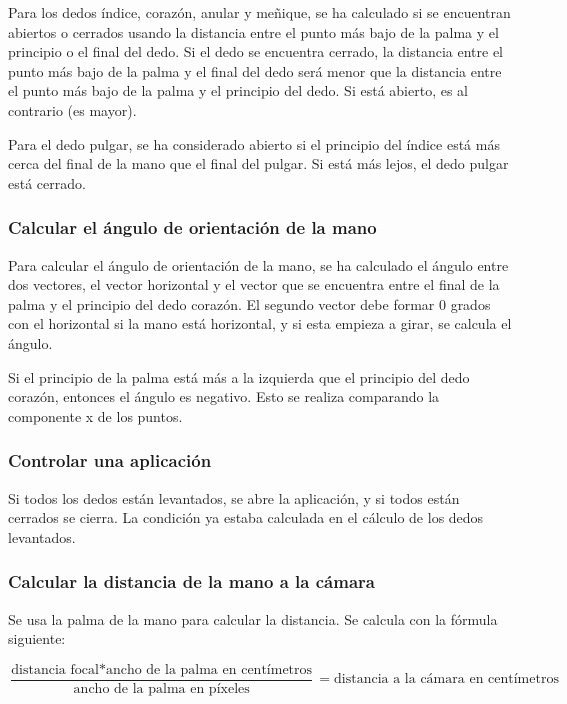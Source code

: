 \documentclass[12pt]{article}
\begin{document}
Para los dedos índice, corazón, anular y meñique, se ha calculado si se encuentran abiertos o cerrados usando la distancia entre el punto más bajo de la palma y el principio o el final del dedo. Si el dedo se encuentra cerrado, la distancia entre el punto más bajo de la palma y el final del dedo será menor que la distancia entre el punto más bajo de la palma y el principio del dedo. Si está abierto, es al contrario (es mayor).

Para el dedo pulgar, se ha considerado abierto si el principio del índice está más cerca del final de la mano que el final del pulgar. Si está más lejos, el dedo pulgar está cerrado.

\subsubsection*{Calcular el ángulo de orientación de la mano}

Para calcular el ángulo de orientación de la mano, se ha calculado el ángulo entre dos vectores, el vector horizontal y el vector que se encuentra entre el final de la palma y el principio del dedo corazón. El segundo vector debe formar 0 grados con el horizontal si la mano está horizontal, y si esta empieza a girar, se calcula el ángulo.

Si el principio de la palma está más a la izquierda que el principio del dedo corazón, entonces el ángulo es negativo. Esto se realiza comparando la componente x de los puntos.

\subsubsection*{Controlar una aplicación}

Si todos los dedos están levantados, se abre la aplicación, y si todos están cerrados se cierra. La condición ya estaba calculada en el cálculo de los dedos levantados.

\subsubsection*{Calcular la distancia de la mano a la cámara}

Se usa la palma de la mano para calcular la distancia. Se calcula con la fórmula siguiente:

$$\frac{\text{distancia focal} * \text{ancho de la palma en centímetros}}{\text{ancho de la palma en píxeles}} = \text{distancia a la cámara en centímetros}$$
\end{document}
